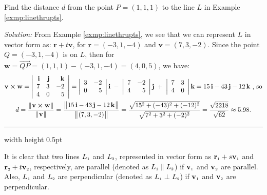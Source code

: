 \begin{exmp}
 Find the distance $d$ from the point $P = (1,1,1)$ to the line $L$ in Example \ref{exmp:linethrupts}.\vspace{1mm}
 \par\noindent\emph{Solution:} From Example \ref{exmp:linethrupts}, we see that we can represent $L$ in vector form as:
 $\textbf{r} + t \textbf{v}$, for $\textbf{r} = (-3,1,-4)$ and $\textbf{v} = (7,3,-2)$. Since the point $Q = (-3,1,-4)$
 is on $L$, then for $\textbf{w} = \overrightarrow{QP} = (1,1,1) - (-3,1,-4) = (4,0,5)$, we have:
 \begin{gather*}
  \textbf{v} \bm{\times} \textbf{w} = \left|\begin{array}{rrr}\textbf{i} & \textbf{j} & \textbf{k}\\7 & 3 & -2\\
   4 & 0 & 5\end{array}\right|
   = \left|\begin{array}{rr}3 & -2\\0 & 5\end{array}\right| \textbf{i} \;-\;
     \left|\begin{array}{rr}7 & -2\\4 & 5\end{array}\right| \textbf{j} \;+\;
     \left|\begin{array}{rr}7 & 3\\4 & 0\end{array}\right| \textbf{k}
   = 15\,\textbf{i} - 43\,\textbf{j} - 12\,\textbf{k} \text{~,~so}\\
  d = \frac{\lVert\mspace{1mu}\textbf{v} \bm{\times} \textbf{w}\mspace{1mu}\rVert}{\lVert\mspace{1mu}\textbf{v}\mspace{1mu}\rVert} =
   \frac{\bigl\lVert\mspace{1mu}15\,\textbf{i} - 43\,\textbf{j} - 12\,\textbf{k}\mspace{1mu}\bigr\rVert}{\bigl\lVert\mspace{1mu}(7,3,-2)\mspace{1mu}\bigr\rVert}
  = \frac{\sqrt{15^2 + (-43)^2 + (-12)^2}}{\sqrt{7^2 + 3^2 + (-2)^2}}
  = \frac{\sqrt{2218}}{\sqrt{62}} \approx 5.98.
 \end{gather*}
\end{exmp}\vspace{-1mm}
\hrule width \textwidth height 0.5pt
\vspace{2mm}

It is clear that two lines $L_{\scriptscriptstyle 1}$ and $L_{\scriptscriptstyle 2}$, represented in vector form as
$\textbf{r}_{\scriptscriptstyle 1} + s \textbf{v}_{\scriptscriptstyle 1}$ and $\textbf{r}_{\scriptscriptstyle 2} + t \textbf{v}_{\scriptscriptstyle 2}$, respectively, are
parallel (denoted as $L_{\scriptscriptstyle 1} \parallel L_{\scriptscriptstyle 2}$) if $\textbf{v}_{\scriptscriptstyle 1}$ and $\textbf{v}_{\scriptscriptstyle 2}$ are
parallel. 
Also, $L_{\scriptscriptstyle 1}$ and $L_{\scriptscriptstyle 2}$ are perpendicular (denoted as $L_{\scriptscriptstyle 1} \perp L_{\scriptscriptstyle 2}$) if
$\textbf{v}_{\scriptscriptstyle 1}$ and $\textbf{v}_{\scriptscriptstyle 2}$ are perpendicular.

